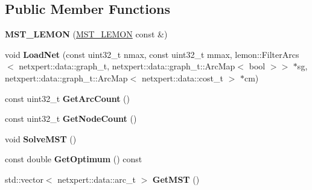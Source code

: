 \subsection*{Public Member Functions}
\begin{DoxyCompactItemize}
\item 
{\bfseries M\+S\+T\+\_\+\+L\+E\+M\+ON} (\hyperlink{classnetxpert_1_1core_1_1MST__LEMON}{M\+S\+T\+\_\+\+L\+E\+M\+ON} const \&)\hypertarget{classnetxpert_1_1core_1_1MST__LEMON_ac2080ff498479ad27ef116fbf30d3f54}{}\label{classnetxpert_1_1core_1_1MST__LEMON_ac2080ff498479ad27ef116fbf30d3f54}

\item 
void {\bfseries Load\+Net} (const uint32\+\_\+t nmax, const uint32\+\_\+t mmax, lemon\+::\+Filter\+Arcs$<$ netxpert\+::data\+::graph\+\_\+t, netxpert\+::data\+::graph\+\_\+t\+::\+Arc\+Map$<$ bool $>$$>$ $\ast$sg, netxpert\+::data\+::graph\+\_\+t\+::\+Arc\+Map$<$ netxpert\+::data\+::cost\+\_\+t $>$ $\ast$cm)\hypertarget{classnetxpert_1_1core_1_1MST__LEMON_a448fcf32a87f7b50cd1fc98de6203455}{}\label{classnetxpert_1_1core_1_1MST__LEMON_a448fcf32a87f7b50cd1fc98de6203455}

\item 
const uint32\+\_\+t {\bfseries Get\+Arc\+Count} ()\hypertarget{classnetxpert_1_1core_1_1MST__LEMON_abab7f45f5f852e3c50055b80d8af3414}{}\label{classnetxpert_1_1core_1_1MST__LEMON_abab7f45f5f852e3c50055b80d8af3414}

\item 
const uint32\+\_\+t {\bfseries Get\+Node\+Count} ()\hypertarget{classnetxpert_1_1core_1_1MST__LEMON_a59e9be23d8510793b923215e04550331}{}\label{classnetxpert_1_1core_1_1MST__LEMON_a59e9be23d8510793b923215e04550331}

\item 
void {\bfseries Solve\+M\+ST} ()\hypertarget{classnetxpert_1_1core_1_1MST__LEMON_a87b03ee759c07889d67a0a9e7217c9db}{}\label{classnetxpert_1_1core_1_1MST__LEMON_a87b03ee759c07889d67a0a9e7217c9db}

\item 
const double {\bfseries Get\+Optimum} () const \hypertarget{classnetxpert_1_1core_1_1MST__LEMON_acbd6542af3507ef86026da35dd0b5c6d}{}\label{classnetxpert_1_1core_1_1MST__LEMON_acbd6542af3507ef86026da35dd0b5c6d}

\item 
std\+::vector$<$ netxpert\+::data\+::arc\+\_\+t $>$ {\bfseries Get\+M\+ST} ()\hypertarget{classnetxpert_1_1core_1_1MST__LEMON_ae67321433134e8d75c394bc8c73d3610}{}\label{classnetxpert_1_1core_1_1MST__LEMON_ae67321433134e8d75c394bc8c73d3610}

\end{DoxyCompactItemize}
